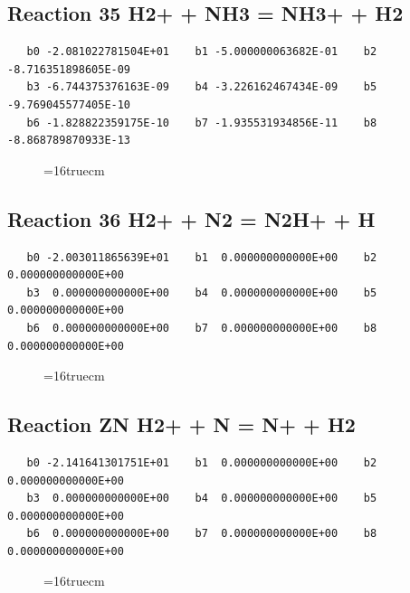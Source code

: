 \documentclass[12pt,dvipdfm]{article}
\begin{document}
\subsection{
Reaction 35 H2+ + NH3 = NH3+ + H2}
\begin{small}\begin{verbatim}
   b0 -2.081022781504E+01    b1 -5.000000063682E-01    b2 -8.716351898605E-09
   b3 -6.744375376163E-09    b4 -3.226162467434E-09    b5 -9.769045577405E-10
   b6 -1.828822359175E-10    b7 -1.935531934856E-11    b8 -8.868789870933E-13
   \end{verbatim}\end{small}
\begin{figure}[h!]
\label{n2rates}
\epsfxsize=16truecm
\end{figure}
\newpage

\subsection{
Reaction 36 H2+ + N2 = N2H+ + H}
\begin{small}\begin{verbatim}
   b0 -2.003011865639E+01    b1  0.000000000000E+00    b2  0.000000000000E+00
   b3  0.000000000000E+00    b4  0.000000000000E+00    b5  0.000000000000E+00
   b6  0.000000000000E+00    b7  0.000000000000E+00    b8  0.000000000000E+00
   \end{verbatim}\end{small}
\begin{figure}[h!]
\label{n2rates}
\epsfxsize=16truecm
\end{figure}
\newpage

\subsection{
Reaction ZN H2+ + N = N+ + H2}
\begin{small}\begin{verbatim}
   b0 -2.141641301751E+01    b1  0.000000000000E+00    b2  0.000000000000E+00
   b3  0.000000000000E+00    b4  0.000000000000E+00    b5  0.000000000000E+00
   b6  0.000000000000E+00    b7  0.000000000000E+00    b8  0.000000000000E+00
   \end{verbatim}\end{small}
\begin{figure}[h!]
\label{n2rates}
\epsfxsize=16truecm
\end{figure}
\newpage
\end{document}
